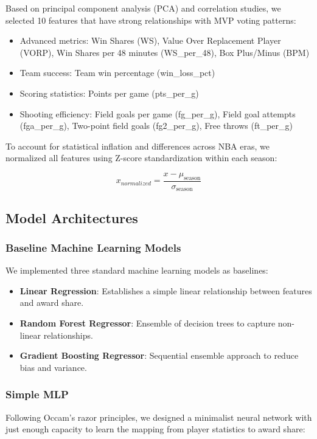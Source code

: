 \documentclass[10pt,twocolumn,letterpaper]{article}
\begin{document}
Based on principal component analysis (PCA) and correlation studies, we selected 10 features that have strong relationships with MVP voting patterns:

\begin{itemize}
    \item Advanced metrics: Win Shares (WS), Value Over Replacement Player (VORP), Win Shares per 48 minutes (WS\_per\_48), Box Plus/Minus (BPM)
    \item Team success: Team win percentage (win\_loss\_pct)
    \item Scoring statistics: Points per game (pts\_per\_g)
    \item Shooting efficiency: Field goals per game (fg\_per\_g), Field goal attempts (fga\_per\_g), Two-point field goals (fg2\_per\_g), Free throws (ft\_per\_g)
\end{itemize}

To account for statistical inflation and differences across NBA eras, we normalized all features using Z-score standardization within each season:

\begin{equation}
x_{normalized} = \frac{x - \mu_{\text{season}}}{\sigma_{\text{season}}}
\end{equation}

\subsection{Model Architectures}

\subsubsection{Baseline Machine Learning Models}

We implemented three standard machine learning models as baselines:

\begin{itemize}
    \item \textbf{Linear Regression}: Establishes a simple linear relationship between features and award share.
    \item \textbf{Random Forest Regressor}: Ensemble of decision trees to capture non-linear relationships.
    \item \textbf{Gradient Boosting Regressor}: Sequential ensemble approach to reduce bias and variance.
\end{itemize}

\subsubsection{Simple MLP}
Following Occam's razor principles, we designed a minimalist neural network with just enough capacity to learn the mapping from player statistics to award share:
\end{document}

